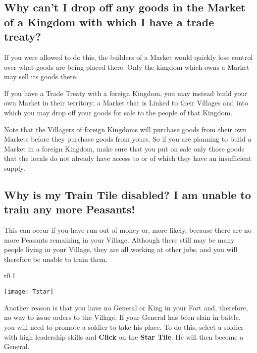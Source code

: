 \subsection{Why can’t I drop off any goods in the Market of a Kingdom with which I have a trade treaty?}

If you were allowed to do this, the builders of a Market would quickly lose control over what goods are being placed there. Only the kingdom which owns a Market may sell its goods there.


If you have a Trade Treaty with a foreign Kingdom, you may instead build your own Market in their territory; a Market that is Linked to their Villages and into which you may drop off your goods for sale to the people of that Kingdom.

Note that the Villagers of foreign Kingdoms will purchase goods from their own Markets before they purchase goods from yours. So if you are planning to build a Market in a foreign Kingdom, make sure that you put on sale only those goods that the locals do not already have access to or of which they have an insufficient supply.

\subsection{Why is my Train Tile disabled? I am unable to train any more Peasants!}

This can occur if you have run out of money or, more likely, because there are no more Peasants remaining in your Village. Although there still may be many people living in your Village, they are all working at other jobs, and you will therefore be unable to train them.

\begin{wrapfigure}{r}{0.1\textwidth}
	\vspace{-20pt}
	\begin{center}
		\texttt{[image: Tstar]}
	\end{center}
	\vspace{-20pt}
\end{wrapfigure}


Another reason is that you have no General or King in your Fort and, therefore, no way to issue orders to the Village. If your General has been slain in battle, you will need to promote a soldier to take his place. To do this, select a soldier with high leadership skills and \textbf{Click} on the \textbf{Star Tile}. He will then become a General.

